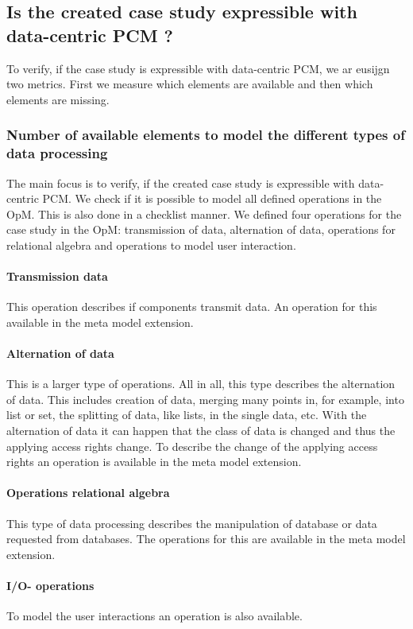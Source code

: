 \subsection{Is the created case study expressible with data-centric PCM ?}
To verify, if the case study is expressible with data-centric PCM, we ar eusijgn two metrics. First we measure which elements are available and then which elements are missing.
\subsubsection{Number of available elements to model the different types of data processing}
The main focus is to verify, if the created case study is expressible with data-centric PCM. We check if it is possible to model all defined operations in the OpM. %
This is also done in a checklist manner.
We defined four operations for the case study in the OpM: transmission of data, alternation of data, operations for relational algebra and operations to model user interaction. 

\paragraph{Transmission data}
This operation describes if components transmit data. An operation for this available in the meta model extension.

\paragraph{Alternation of data}
This is a larger type of operations. All in all, this type describes the alternation of data. This includes
creation of data, merging many points in, for example, into list or set, the splitting of data, like lists, in the single data, etc. With the alternation of data it can happen that the class of data is changed and thus the applying access rights change. To describe the change of the applying access rights an operation is available in the meta model extension. 

\paragraph{Operations relational algebra}
This type of data processing describes the manipulation of database or data requested from databases. The operations for this are available in the meta model extension. 

\paragraph{I/O- operations}
To model the user interactions an operation is also available.


